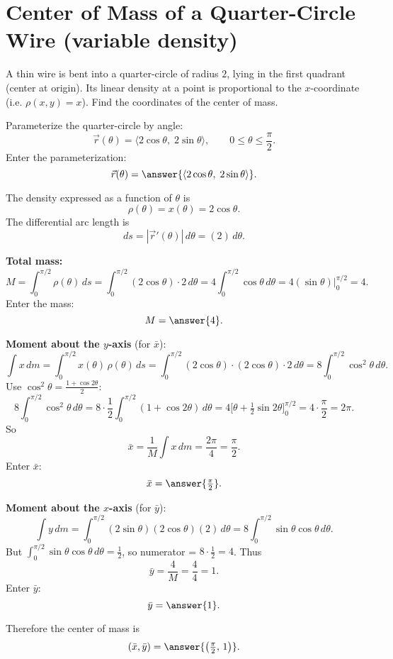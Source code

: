 \documentclass{ximera}
\begin{document}
\section*{Center of Mass of a Quarter-Circle Wire (variable density)}

\begin{problem}
A thin wire is bent into a quarter-circle of radius $2$, lying in the first quadrant (center at origin). Its linear density at a point is proportional to the $x$-coordinate (i.e. $\rho(x,y)=x$). Find the coordinates of the center of mass.
\end{problem}

\begin{solution}
Parameterize the quarter-circle by angle:
\[
\vec r(\theta)=\langle 2\cos\theta,\;2\sin\theta\rangle,\qquad 0\le\theta\le\frac{\pi}{2}.
\]
Enter the parameterization:
\[
\vec r(\theta)=\answer{\langle 2\cos\theta,\;2\sin\theta\rangle}.
\]

The density expressed as a function of $\theta$ is
\[
\rho(\theta)=x(\theta)=2\cos\theta.
\]
The differential arc length is
\[
ds=|\vec r'(\theta)|\,d\theta = (2)\,d\theta.
\]

\textbf{Total mass:}
\[
M=\int_0^{\pi/2} \rho(\theta)\,ds
=\int_0^{\pi/2} (2\cos\theta)\cdot 2\,d\theta
=4\int_0^{\pi/2}\cos\theta\,d\theta
=4(\sin\theta)\Big|_0^{\pi/2}=4.
\]
Enter the mass:
\[
M=\answer{4}.
\]

\textbf{Moment about the $y$-axis} (for $\bar x$):
\[
\int x\,dm = \int_0^{\pi/2} x(\theta)\,\rho(\theta)\,ds
= \int_0^{\pi/2} (2\cos\theta)\cdot(2\cos\theta)\cdot 2\,d\theta
=8\int_0^{\pi/2}\cos^2\theta\,d\theta.
\]
Use $\cos^2\theta=\frac{1+\cos 2\theta}{2}$:
\[
8\int_0^{\pi/2}\cos^2\theta\,d\theta
=8\cdot\frac{1}{2}\int_0^{\pi/2}(1+\cos 2\theta)\,d\theta
=4\Big[\theta+\tfrac{1}{2}\sin 2\theta\Big]_0^{\pi/2}
=4\cdot\frac{\pi}{2}=2\pi.
\]
So
\[
\bar x=\frac{1}{M}\int x\,dm=\frac{2\pi}{4}=\frac{\pi}{2}.
\]
Enter $\bar x$:
\[
\bar x=\answer{\tfrac{\pi}{2}}.
\]

\textbf{Moment about the $x$-axis} (for $\bar y$):
\[
\int y\,dm = \int_0^{\pi/2} (2\sin\theta)(2\cos\theta)(2)\,d\theta
=8\int_0^{\pi/2}\sin\theta\cos\theta\,d\theta.
\]
But $\int_0^{\pi/2}\sin\theta\cos\theta\,d\theta = \tfrac12$, so numerator = $8\cdot\tfrac12=4$.
Thus
\[
\bar y=\frac{4}{M}=\frac{4}{4}=1.
\]
Enter $\bar y$:
\[
\bar y=\answer{1}.
\]

Therefore the center of mass is
\[
(\bar x,\bar y)=\answer{\left(\tfrac{\pi}{2},\,1\right)}.
\]

\bigskip
\begin{multipleChoice}
\end{multipleChoice}
\end{solution}
\end{document}
